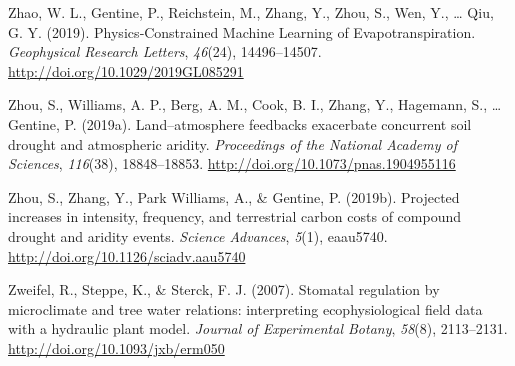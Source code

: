 \documentclass[11pt,twoside]{reedthesis}
\begin{document}
\hypertarget{ref-zhao_physicsconstrained_2019}{}
Zhao, W. L., Gentine, P., Reichstein, M., Zhang, Y., Zhou, S., Wen, Y.,
\ldots{} Qiu, G. Y. (2019). Physics‐Constrained Machine Learning of
Evapotranspiration. \emph{Geophysical Research Letters}, \emph{46}(24),
14496--14507. \url{http://doi.org/10.1029/2019GL085291}

\hypertarget{ref-zhou_landatmosphere_2019}{}
Zhou, S., Williams, A. P., Berg, A. M., Cook, B. I., Zhang, Y.,
Hagemann, S., \ldots{} Gentine, P. (2019a). Land--atmosphere feedbacks
exacerbate concurrent soil drought and atmospheric aridity.
\emph{Proceedings of the National Academy of Sciences}, \emph{116}(38),
18848--18853. \url{http://doi.org/10.1073/pnas.1904955116}

\hypertarget{ref-zhou_projected_2019}{}
Zhou, S., Zhang, Y., Park Williams, A., \& Gentine, P. (2019b).
Projected increases in intensity, frequency, and terrestrial carbon
costs of compound drought and aridity events. \emph{Science Advances},
\emph{5}(1), eaau5740. \url{http://doi.org/10.1126/sciadv.aau5740}

\hypertarget{ref-Zweifel2007}{}
Zweifel, R., Steppe, K., \& Sterck, F. J. (2007). Stomatal regulation by
microclimate and tree water relations: interpreting ecophysiological
field data with a hydraulic plant model. \emph{Journal of Experimental
Botany}, \emph{58}(8), 2113--2131.
\url{http://doi.org/10.1093/jxb/erm050}


\end{document}
